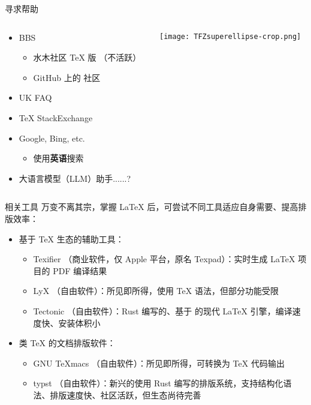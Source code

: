 \begin{frame}{寻求帮助}
  \begin{columns}[c]
    \begin{column}{.45\textwidth}
      \begin{itemize}
        \item BBS
          \begin{itemize}
            \item 水木社区 TeX 版 （不活跃）
            \item GitHub 上的 \CTeX 社区 
          \end{itemize}
        \item UK FAQ 
        \item \TeX{} StackExchange 
        \item Google, Bing, etc.
          \begin{itemize}
            \item 使用\textbf{英语}搜索
          \end{itemize}
        \item 大语言模型（LLM）助手......?
      \end{itemize}
    \end{column}
    \begin{column}{.45\textwidth}
      \texttt{[image: TFZsuperellipse-crop.png]}
    \end{column}
  \end{columns}
\end{frame}

\begin{frame}{相关工具}
  万变不离其宗，掌握 \LaTeX{} 后，可尝试不同工具适应自身需要、提高排版效率：
  \begin{itemize}
    \item 基于 \TeX{} 生态的辅助工具：
    \begin{itemize}
      \item Texifier （商业软件，仅 Apple 平台，原名 Texpad）：实时生成 \LaTeX{} 项目的 PDF 编译结果
      \item LyX （自由软件）：所见即所得，使用 \TeX{} 语法，但部分功能受限
      \item Tectonic （自由软件）：Rust 编写的、基于 \XeTeX{} 的现代 \LaTeX{} 引擎，编译速度快、安装体积小
    \end{itemize}
    \item 类 \TeX{} 的文档排版软件：
    \begin{itemize}
      \item GNU TeXmacs （自由软件）：所见即所得，可转换为 \TeX{} 代码输出
      \item typst （自由软件）：新兴的使用 Rust 编写的排版系统，支持结构化语法、排版速度快、社区活跃，但生态尚待完善
    \end{itemize}
  \end{itemize}
\end{frame}

